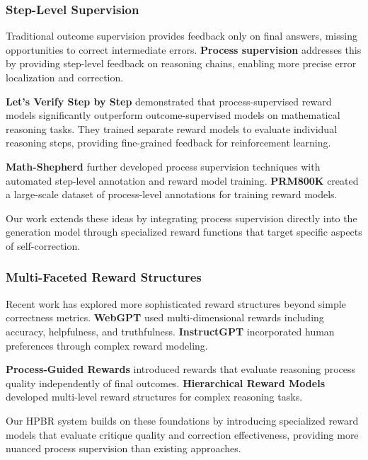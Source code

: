 \documentclass[10pt,twocolumn]{article}
\newcommand{\hpbr}{\textsc{HPBR}}
\begin{document}
\subsubsection{Step-Level Supervision}

Traditional outcome supervision provides feedback only on final answers, missing opportunities to correct intermediate errors. \textbf{Process supervision} \cite{uesato2022solving} addresses this by providing step-level feedback on reasoning chains, enabling more precise error localization and correction.

\textbf{Let's Verify Step by Step} \cite{lightman2023lets} demonstrated that process-supervised reward models significantly outperform outcome-supervised models on mathematical reasoning tasks. They trained separate reward models to evaluate individual reasoning steps, providing fine-grained feedback for reinforcement learning.

\textbf{Math-Shepherd} \cite{wang2023math} further developed process supervision techniques with automated step-level annotation and reward model training. \textbf{PRM800K} \cite{lightman2023lets} created a large-scale dataset of process-level annotations for training reward models.

Our work extends these ideas by integrating process supervision directly into the generation model through specialized reward functions that target specific aspects of self-correction.

\subsubsection{Multi-Faceted Reward Structures}

Recent work has explored more sophisticated reward structures beyond simple correctness metrics. \textbf{WebGPT} \cite{nakano2021webgpt} used multi-dimensional rewards including accuracy, helpfulness, and truthfulness. \textbf{InstructGPT} \cite{ouyang2022training} incorporated human preferences through complex reward modeling.

\textbf{Process-Guided Rewards} \cite{wang2023process} introduced rewards that evaluate reasoning process quality independently of final outcomes. \textbf{Hierarchical Reward Models} \cite{liang2023hierarchical} developed multi-level reward structures for complex reasoning tasks.

Our \hpbr{} system builds on these foundations by introducing specialized reward models that evaluate critique quality and correction effectiveness, providing more nuanced process supervision than existing approaches.
\end{document}
